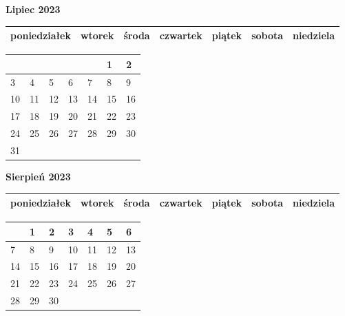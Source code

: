 \clearpage

\begin{landscape}
    \begin{center}
        \textbf{\huge{Lipiec 2023}}
    \end{center}

    \vspace{-3mm}

    \thispagestyle{empty}
    \noindent
    \begin{tabularx}{28.7cm}{|Y|Y|Y|Y|Y|Y|Y|}
        \hline
poniedziałek & wtorek & środa & czwartek & piątek & sobota & niedziela \\ [-0.5mm]
        \hline
    \end{tabularx}

    \vspace{-0.5mm}

    \noindent
    \begin{tabularx}{28.7cm}{|X|X|X|X|X|X|X|}
        \hline
& & & & & 1 & 2 \\ [25.0mm]
\hline
3 & 4 & 5 & 6 & 7 & 8 & 9 \\ [25.0mm]
\hline
10 & 11 & 12 & 13 & 14 & 15 & 16 \\ [25.0mm]
\hline
17 & 18 & 19 & 20 & 21 & 22 & 23 \\ [25.0mm]
\hline
24 & 25 & 26 & 27 & 28 & 29 & 30 \\ [25.0mm]
\hline
31 & & & & & & \\ [25.0mm]
\hline

    \end{tabularx}
\end{landscape}

\clearpage

\begin{landscape}
    \begin{center}
        \textbf{\huge{Sierpień 2023}}
    \end{center}

    \vspace{-3mm}

    \thispagestyle{empty}
    \noindent
    \begin{tabularx}{28.7cm}{|Y|Y|Y|Y|Y|Y|Y|}
        \hline
poniedziałek & wtorek & środa & czwartek & piątek & sobota & niedziela \\ [-0.5mm]
        \hline
    \end{tabularx}

    \vspace{-0.5mm}

    \noindent
    \begin{tabularx}{28.7cm}{|X|X|X|X|X|X|X|}
        \hline
& 1 & 2 & 3 & 4 & 5 & 6 \\ [31.0mm]
\hline
7 & 8 & 9 & 10 & 11 & 12 & 13 \\ [31.0mm]
\hline
14 & 15 & 16 & 17 & 18 & 19 & 20 \\ [31.0mm]
\hline
21 & 22 & 23 & 24 & 25 & 26 & 27 \\ [31.0mm]
\hline
28 & 29 & 30 & & & & \\ [31.0mm]
\hline

    \end{tabularx}
\end{landscape}


